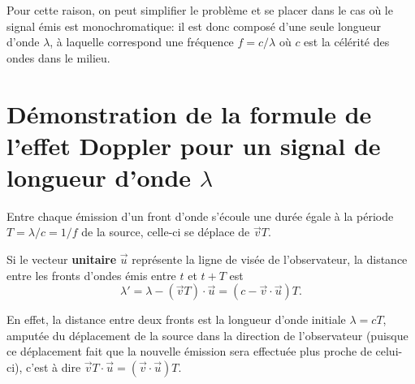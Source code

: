 \documentclass{article}
\theoremstyle{definition}
\begin{document}
Pour cette raison, on peut simplifier le problème et se placer dans le cas où le signal émis est monochromatique: il est donc composé d'une seule longueur d'onde $\lambda$, à laquelle correspond une fréquence $f = c/\lambda$ où $c$ est la célérité des ondes dans le milieu.

\section{Démonstration de la formule de l'effet Doppler pour un signal de longueur d'onde $\lambda$}

Entre chaque émission d'un front d'onde s'écoule une durée égale à la période $T=\lambda/c=1/f$ de la source, celle-ci se déplace de $\vec v T$.

\begin{center}
\end{center}

Si le vecteur \textbf{unitaire} $\vec u$ représente la ligne de visée de l'observateur, la distance entre les fronts d'ondes émis entre $t$ et $t+T$ est 
\begin{equation}\boxed{
\lambda' = \lambda - (\vec vT)\cdot\vec u =  (c-\vec v\cdot\vec u)T.}
\end{equation}

En effet, la distance entre deux fronts est la longueur d'onde initiale $\lambda = cT$, amputée du déplacement de la source dans la direction de l'observateur (puisque ce déplacement fait que la nouvelle émission sera effectuée plus proche de celui-ci), c'est à dire $\vec v T \cdot \vec u = (\vec v \cdot \vec u)T$.

\begin{center}
\end{center}
\end{document}
